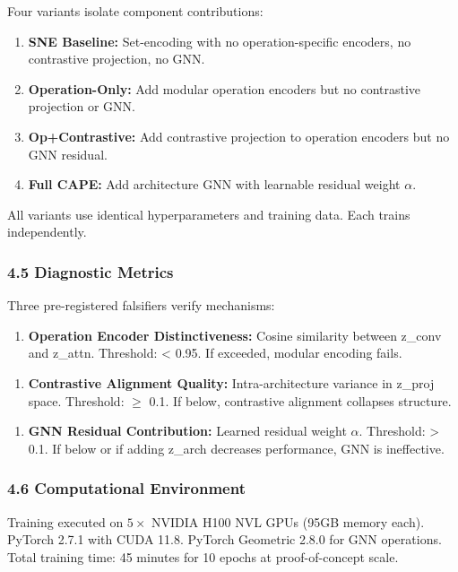 Four variants isolate component contributions:

\begin{enumerate}
\item \textbf{SNE Baseline:} Set-encoding with no operation-specific encoders, no contrastive projection, no GNN.
\item \textbf{Operation-Only:} Add modular operation encoders but no contrastive projection or GNN.
\item \textbf{Op+Contrastive:} Add contrastive projection to operation encoders but no GNN residual.
\item \textbf{Full CAPE:} Add architecture GNN with learnable residual weight $\alpha$.
\end{enumerate}

All variants use identical hyperparameters and training data. Each trains independently.

\subsubsection{4.5 Diagnostic Metrics}

Three pre-registered falsifiers verify mechanisms:

\begin{enumerate}
\item \textbf{Operation Encoder Distinctiveness:} Cosine similarity between z\_conv and z\_attn. Threshold: < 0.95. If exceeded, modular encoding fails.
\end{enumerate}

\begin{enumerate}
\item \textbf{Contrastive Alignment Quality:} Intra-architecture variance in z\_proj space. Threshold: $\geq$ 0.1. If below, contrastive alignment collapses structure.
\end{enumerate}

\begin{enumerate}
\item \textbf{GNN Residual Contribution:} Learned residual weight $\alpha$. Threshold: > 0.1. If below or if adding z\_arch decreases performance, GNN is ineffective.
\end{enumerate}

\subsubsection{4.6 Computational Environment}

Training executed on $5\times$ NVIDIA H100 NVL GPUs (95GB memory each). PyTorch 2.7.1 with CUDA 11.8. PyTorch Geometric 2.8.0 for GNN operations. Total training time: 45 minutes for 10 epochs at proof-of-concept scale.
